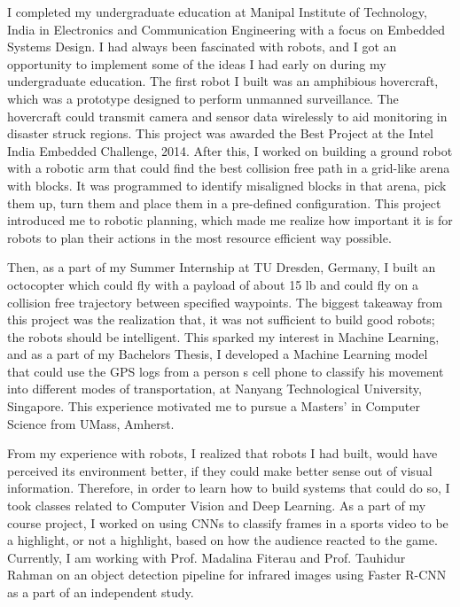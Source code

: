 \documentclass[11pt]{article}
\begin{document}
I completed my undergraduate education at Manipal Institute of Technology, India in Electronics and Communication Engineering with a focus on Embedded Systems Design. I had always been fascinated with robots, and I got an opportunity to implement some of the ideas I had early on during my undergraduate education. The first robot I built was an amphibious hovercraft, which was a prototype designed to perform unmanned surveillance. The hovercraft could transmit camera and sensor data wirelessly to aid monitoring in disaster struck regions. This project was awarded the Best Project at the Intel India Embedded Challenge, 2014. After this, I worked on building a ground robot with a robotic arm that could find the best collision free path in a grid-like arena with blocks. It was programmed to identify misaligned blocks in that arena, pick them up, turn them and place them in a pre-defined configuration. This project introduced me to robotic planning, which made me realize how important it is for robots to plan their actions in the most resource efficient way possible.
\par
\justify
Then, as a part of my Summer Internship at TU Dresden, Germany, I built an octocopter which could fly with a payload of about 15 lb and could fly on a collision free trajectory between specified waypoints. The biggest takeaway from this project was the realization that, it was not sufficient to build good robots; the robots should be intelligent. This sparked my interest in Machine Learning, and as a part of my Bachelor\textquotesingle s Thesis, I developed a Machine Learning model that could use the GPS logs from a person \textquotesingle s cell phone to classify his movement into different modes of transportation, at Nanyang Technological University, Singapore. This experience  motivated me to pursue a Masters' in Computer Science from UMass, Amherst.
\par
\justify
 From my experience with robots, I realized that robots I had built, would have perceived its environment better, if they could make better sense out of visual information. Therefore, in order to learn how to build systems that could do so, I took classes related to Computer Vision and Deep Learning. As a part of my course project, I worked on using CNNs to classify frames in a sports video to be a highlight, or not a highlight, based on how the audience reacted to the game. Currently, I am working with Prof. Madalina Fiterau and Prof. Tauhidur Rahman on an object detection pipeline for infrared images using Faster R-CNN as a part of an independent study.
\end{document}
